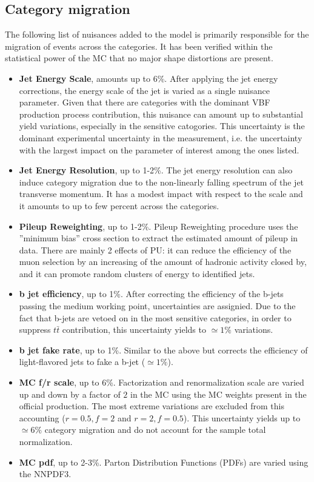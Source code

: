 \subsection{Category migration}
The following list of nuisances added to the model is primarily responsible for the migration of events across the categories. It has been verified within the statistical power of the MC that no major shape distortions are present.
\begin{itemize}
    \item {\bf Jet Energy Scale}, amounts up to 6\%. After applying the jet energy corrections, the energy scale of the jet is varied as a single nuisance parameter.
    Given that there are categories with the dominant VBF production process contribution, this nuisance can amount up to substantial yield variations, especially in the sensitive catogories. This uncertainty is the dominant experimental uncertainty in the measurement, i.e. the uncertainty with the largest impact on the parameter of interest among the ones listed.
    \item {\bf Jet Energy Resolution}, up to 1-2\%. The jet energy resolution can also induce category migration due to the non-linearly falling spectrum of the jet transverse momentum. It has a modest impact with respect to the scale and it amounts to up to few percent across the categories.
    \item {\bf Pileup Reweighting}, up to 1-2\%. Pileup Reweighting procedure uses the ''minimum bias'' cross section to extract the estimated amount of pileup in data. There are mainly 2 effects of PU: it can reduce the efficiency of the muon selection by an increasing of the amount of hadronic activity closed by, and it can promote random clusters of energy to identified jets.
    \item {\bf b jet efficiency}, up to 1\%. After correcting the efficiency of the b-jets passing the medium working point, uncertainties are assignied. Due to the fact that b-jets are vetoed on in the most sensitive categories, in order to suppress {$t\bar{t}$} contribution, this uncertainty yields to $\simeq 1\%$ variations.
    \item {\bf b jet fake rate}, up to 1\%. Similar to the above but corrects the efficiency of light-flavored jets to fake a b-jet ($\simeq 1\%$).
    \item {\bf MC f/r scale}, up to 6\%. Factorization and renormalization scale are varied up and down by a factor of $2$ in the MC using the MC weights present in the official production. The most extreme variations are excluded from this accounting ($r=0.5,f=2$ and $r=2,f=0.5$). This uncertainty yields up to $\simeq 6\%$ category migration and do not account for the sample total normalization.
    \item {\bf MC pdf}, up to 2-3\%. Parton Distribution Functions (PDFs) are varied using the NNPDF3.
\end{itemize}
